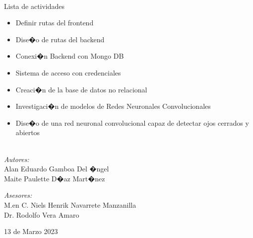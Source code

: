 \documentclass[12pt,letterpaper]{article}
\begin{document}
\begin{titlepage}
\begin{center}
\HRule \\[1.5cm]

\begin{center}

Lista de actividades
 

\begin{itemize}
\item Definir rutas del frontend
\item Dise�o de rutas del backend  
\item Conexi�n Backend con Mongo DB
\item Sistema de acceso con credenciales
\item Creaci�n de la base de datos no relacional
\item	Investigaci�n de modelos de Redes Neuronales Convolucionales
\item Dise�o de una red neuronal convolucional capaz de detectar ojos cerrados y abiertos

\end{itemize}

\end{center}


\begin{minipage}{0.4\textwidth}
\begin{flushleft} \large
\emph{\\Autores:}\\
Alan Eduardo Gamboa Del �ngel\\
Maite Paulette D�az Mart�nez\\

\end{flushleft}
\end{minipage}
\begin{minipage}{0.5\textwidth}
\begin{flushright} \large
\emph{Asesores:} \\
M.en C. Niels Henrik Navarrete Manzanilla\\
Dr. Rodolfo Vera Amaro\\

\end{flushright}
\end{minipage}

\vfill

13 de Marzo 2023

\end{center}


\end{titlepage}
\newpage
\tableofcontents
\newpage
\listoffigures
\newpage
\listoftables
\end{document}
